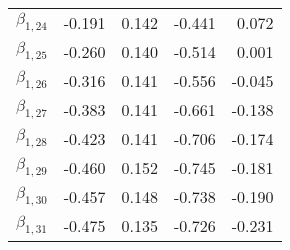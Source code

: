 \begin{tabular}{lrrrr}
$\beta_{1,24}$ & -0.191 &     0.142 &   -0.441 &     0.072 \\
$\beta_{1,25}$ & -0.260 &     0.140 &   -0.514 &     0.001 \\
$\beta_{1,26}$ & -0.316 &     0.141 &   -0.556 &    -0.045 \\
$\beta_{1,27}$ & -0.383 &     0.141 &   -0.661 &    -0.138 \\
$\beta_{1,28}$ & -0.423 &     0.141 &   -0.706 &    -0.174 \\
$\beta_{1,29}$ & -0.460 &     0.152 &   -0.745 &    -0.181 \\
$\beta_{1,30}$ & -0.457 &     0.148 &   -0.738 &    -0.190 \\
$\beta_{1,31}$ & -0.475 &     0.135 &   -0.726 &    -0.231 \\
\bottomrule
\end{tabular}
